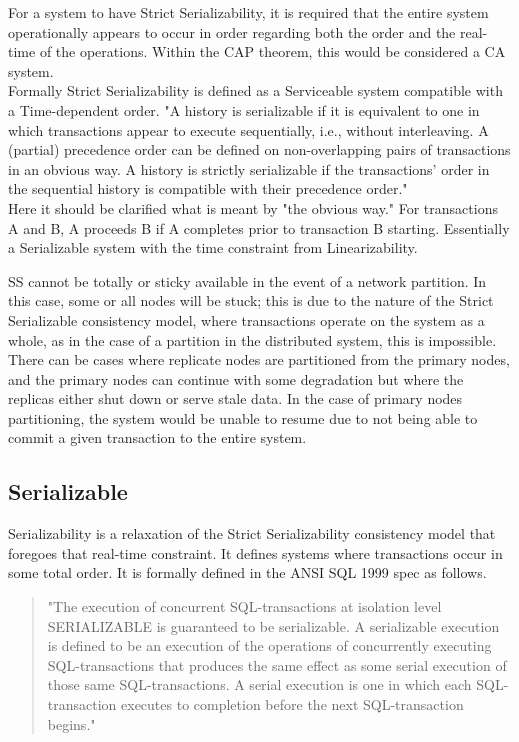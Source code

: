 \documentclass[a4paper,10pt,titlepage]{report}
\begin{document}
For a system to have Strict Serializability, it is required that the entire system operationally appears to occur in order regarding both the order and the real-time of the operations. Within the CAP theorem, this would be considered a CA system.\\
\vspace{5mm}
Formally Strict Serializability is defined as a Serviceable system compatible with a Time-dependent order.
"A history is serializable if it is equivalent to one in which transactions appear to execute sequentially, i.e., without interleaving. A (partial) precedence order can be defined on non-overlapping pairs of transactions in an obvious way. A history is strictly serializable if the transactions' order in the sequential history is compatible with their precedence order." \cite{Herlihy1990Linearizability}\\
\vspace{5mm}
Here it should be clarified what is meant by "the obvious way." For transactions A and B, A proceeds B if A completes prior to transaction B starting. Essentially a Serializable system with the time constraint from Linearizability.

SS cannot be totally or sticky available in the event of a network partition. In this case, some or all nodes will be stuck; this is due to the nature of the Strict Serializable consistency model, where transactions operate on the system as a whole, as in the case of a partition in the distributed system, this is impossible. There can be cases where replicate nodes are partitioned from the primary nodes, and the primary nodes can continue with some degradation but where the replicas either shut down or serve stale data. In the case of primary nodes partitioning, the system would be unable to resume due to not being able to commit a given transaction to the entire system.\\



\newpage
\subsection{Serializable}

Serializability is a relaxation of the Strict Serializability consistency model that foregoes that real-time constraint. It defines systems where transactions occur in some total order. It is formally defined in the ANSI SQL 1999 spec as follows.

\begin{quote}
"The execution of concurrent SQL-transactions at isolation level SERIALIZABLE is guaranteed to be serializable. A serializable execution is defined to be an execution of the operations of concurrently executing SQL-transactions that produces the same effect as some serial execution of those same SQL-transactions. A serial execution is one in which each SQL-transaction executes to completion before the next SQL-transaction begins."\cite{ansisql1999}\\
\end{quote}
\vspace{5mm}
\end{document}
